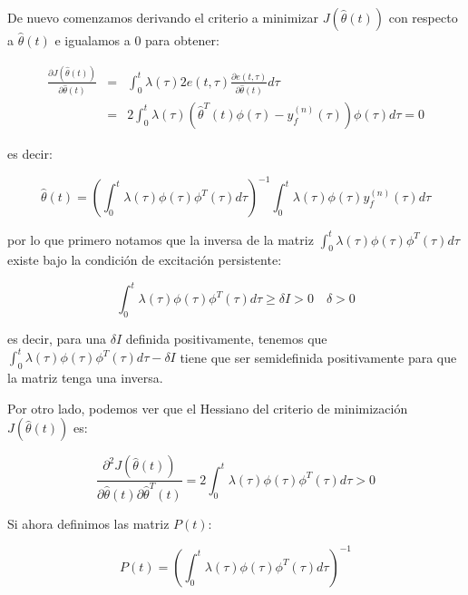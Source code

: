             De nuevo comenzamos derivando el criterio a minimizar $J \left( \hat{\theta}(t) \right)$ con respecto a $\hat{\theta}(t)$ e igualamos a $0$ para obtener:

            \begin{eqnarray*}
                \frac{\partial J \left( \hat{\theta}(t) \right)}{\partial \hat{\theta}(t)} & = & \int_0^t \lambda(\tau) 2 e(t, \tau)\frac{\partial e(t, \tau)}{\partial \hat{\theta}(t)} d\tau \\
                & = & 2 \int_0^t \lambda(\tau) \left( \hat{\theta}^T(t) \phi(\tau) - y_f^{(n)}(\tau) \right) \phi(\tau) d\tau = 0
            \end{eqnarray*}

            es decir:

            \begin{equation} \label{eq:adap9}
                \hat{\theta}(t) = \left( \int_0^t \lambda(\tau) \phi(\tau) \phi^T(\tau) d\tau \right)^{-1} \int_0^t \lambda(\tau) \phi(\tau) y_f^{(n)}(\tau) d\tau
            \end{equation}

            por lo que primero notamos que la inversa de la matriz $\int_0^t \lambda(\tau) \phi(\tau) \phi^T(\tau) d\tau$ existe bajo la condición de excitación persistente:

            \begin{equation}
                \int_0^t \lambda(\tau) \phi(\tau) \phi^T(\tau) d\tau \ge \delta I > 0 \quad \delta > 0
            \end{equation}

            es decir, para una $\delta I$ definida positivamente, tenemos que $\int_0^t \lambda(\tau) \phi(\tau) \phi^T(\tau) d\tau - \delta I$ tiene que ser semidefinida positivamente para que la matriz tenga una inversa.

            Por otro lado, podemos ver que el Hessiano del criterio de minimización $J \left( \hat{\theta}(t) \right)$ es:

            \begin{equation}
                \frac{\partial^2 J \left( \hat{\theta}(t) \right)}{\partial \hat{\theta}(t) \partial \hat{\theta}^T(t)} = 2 \int_0^t \lambda(\tau) \phi(\tau) \phi^T(\tau) d\tau > 0
            \end{equation}

            Si ahora definimos las matriz $P(t)$:

            \begin{equation}
                P(t) = \left( \int_0^t \lambda(\tau) \phi(\tau) \phi^T(\tau) d\tau \right) ^{-1}
            \end{equation}

